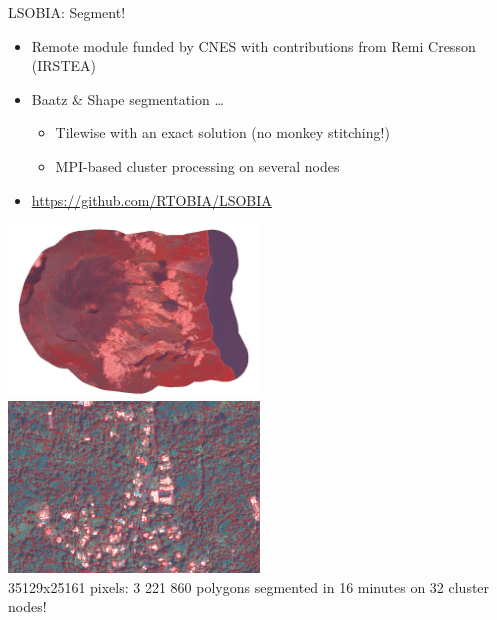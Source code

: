 \begin{frame}{LSOBIA: Segment!}
  \begin{itemize}
    \item Remote module funded by CNES with contributions from Remi Cresson (IRSTEA)
    \item Baatz \& Shape segmentation \ldots
      \begin{itemize}
      \item Tilewise with an exact solution (no monkey stitching!)
      \item MPI-based cluster processing on several nodes
      \end{itemize}
    \item \url{https://github.com/RTOBIA/LSOBIA}
  \end{itemize}

  \includegraphics[width=0.5\textwidth]{images/seg_reunion.png}
  \includegraphics[width=0.5\textwidth]{images/seg_reunion_zoom.png}\\
  35129x25161 pixels: 3 221 860 polygons segmented in 16 minutes on 32 cluster nodes!


  
\end{frame}
  
